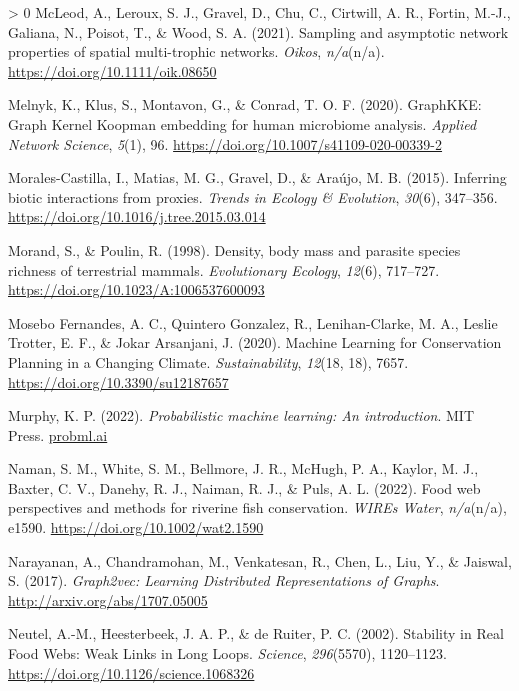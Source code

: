 \documentclass[11pt]{article}
\newlength{\cslhangindent}
\newenvironment{CSLReferences}[3] %
 {%
  \setlength{\parindent}{0pt}
  \ifodd #1 \everypar{\setlength{\hangindent}{\cslhangindent}}\ignorespaces\fi
  \ifnum #2 > 0
  \setlength{\parskip}{#2\baselineskip}
  \fi
 }%
 {}
\begin{document}
\begin{CSLReferences}{1}{0}
\leavevmode\hypertarget{ref-McLeod2021SamAsy}{}%
McLeod, A., Leroux, S. J., Gravel, D., Chu, C., Cirtwill, A. R., Fortin,
M.-J., Galiana, N., Poisot, T., \& Wood, S. A. (2021). Sampling and
asymptotic network properties of spatial multi-trophic networks.
\emph{Oikos}, \emph{n/a}(n/a). \url{https://doi.org/10.1111/oik.08650}

\leavevmode\hypertarget{ref-Melnyk2020GraGra}{}%
Melnyk, K., Klus, S., Montavon, G., \& Conrad, T. O. F. (2020).
GraphKKE: Graph Kernel Koopman embedding for human microbiome analysis.
\emph{Applied Network Science}, \emph{5}(1), 96.
\url{https://doi.org/10.1007/s41109-020-00339-2}

\leavevmode\hypertarget{ref-Morales-Castilla2015InfBio}{}%
Morales-Castilla, I., Matias, M. G., Gravel, D., \& Araújo, M. B.
(2015). Inferring biotic interactions from proxies. \emph{Trends in
Ecology \& Evolution}, \emph{30}(6), 347--356.
\url{https://doi.org/10.1016/j.tree.2015.03.014}

\leavevmode\hypertarget{ref-Morand1998DenBod}{}%
Morand, S., \& Poulin, R. (1998). Density, body mass and parasite
species richness of terrestrial mammals. \emph{Evolutionary Ecology},
\emph{12}(6), 717--727. \url{https://doi.org/10.1023/A:1006537600093}

\leavevmode\hypertarget{ref-MoseboFernandes2020MacLea}{}%
Mosebo Fernandes, A. C., Quintero Gonzalez, R., Lenihan-Clarke, M. A.,
Leslie Trotter, E. F., \& Jokar Arsanjani, J. (2020). Machine Learning
for Conservation Planning in a Changing Climate. \emph{Sustainability},
\emph{12}(18, 18), 7657. \url{https://doi.org/10.3390/su12187657}

\leavevmode\hypertarget{ref-Murphy2022ProMac}{}%
Murphy, K. P. (2022). \emph{Probabilistic machine learning: An
introduction}. MIT Press. \href{https://probml.ai}{probml.ai}

\leavevmode\hypertarget{ref-Naman2022FooWeb}{}%
Naman, S. M., White, S. M., Bellmore, J. R., McHugh, P. A., Kaylor, M.
J., Baxter, C. V., Danehy, R. J., Naiman, R. J., \& Puls, A. L. (2022).
Food web perspectives and methods for riverine fish conservation.
\emph{WIREs Water}, \emph{n/a}(n/a), e1590.
\url{https://doi.org/10.1002/wat2.1590}

\leavevmode\hypertarget{ref-Narayanan2017GraLea}{}%
Narayanan, A., Chandramohan, M., Venkatesan, R., Chen, L., Liu, Y., \&
Jaiswal, S. (2017). \emph{Graph2vec: Learning Distributed
Representations of Graphs}. \url{http://arxiv.org/abs/1707.05005}

\leavevmode\hypertarget{ref-Neutel2002StaRea}{}%
Neutel, A.-M., Heesterbeek, J. A. P., \& de Ruiter, P. C. (2002).
Stability in Real Food Webs: Weak Links in Long Loops. \emph{Science},
\emph{296}(5570), 1120--1123.
\url{https://doi.org/10.1126/science.1068326}


\end{CSLReferences}
\end{document}
